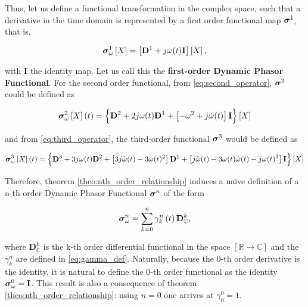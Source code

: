 	Thus, let us define a functional transformation in the complex space, such that a derivative in the time domain is represented by a first order functional map $\boldsymbol{\sigma}^{1}$, that is,

\begin{equation} \boldsymbol{\sigma}^{1}_\omega \left[X\right] = \left[\mathbf{D}^1 + j\omega(t)\mathbf{I}\right]\left[X\right] , \label{eq:steinmetz_1storder}\end{equation}

	\noindent with $\mathbf{I}$ the identity map. Let us call this the \textbf{first-order Dynamic Phasor Functional}. For the second order functional, from \eqref{eq:second_operator}, $\boldsymbol{\sigma}^{2}$ could be defined as

\begin{equation} \ndpo{2}_\omega \left[X\right](t) = \left\{\raisebox{4mm}{} \mathbf{D}^2 + 2j\omega(t)\mathbf{D}^1 + \left[-\omega^2 + j\dot{\omega}(t)\right]\mathbf{I}\right\}\left[X\right] \label{eq:steinmetz_2ndorder}\end{equation}

	\noindent and from \eqref{eq:third_operator}, the third-order functional $\boldsymbol{\sigma}^{3}$ would be defined as

\small
\begin{equation} \ndpo{3}_\omega \left[X\right](t) = \left\{\raisebox{4mm}{} \mathbf{D}^3 + 3j \omega(t) \mathbf{D}^2 + \left[ 3j \dot{\omega}(t) - 3 \omega(t)^2 \right] \mathbf{D}^1 + \left[ j \ddot{\omega}(t) - 3 \omega(t) \dot{\omega}(t) - j \omega(t)^3 \right]\mathbf{I}\right\}\left[X\right] \label{eq:steinmetz_3rdorder}\end{equation}
\normalsize

	Therefore, theorem \ref{theo:nth_order_relationship} induces a naïve definition of a n-th order Dynamic Phasor Functional $\boldsymbol{\sigma}^{n}$ of the form

\begin{equation} \boldsymbol{\sigma}^{n}_\omega = \sum_{k=0}^n \gamma_k^n \left(t\right)\mathbf{D}^k_\mathbb{C} \label{def:operated_dynamic_phasor}, \end{equation}

	\noindent where $\mathbf{D}_\mathbb{C}^k$ is the k-th order differential functional in the space $\left[\mathbb{R}\to\mathbb{C}\right]$ and the $\gamma_k^n$ are defined in \eqref{eq:gamma_def}. Naturally, because the 0-th order derivative is the identity, it is natural to define the 0-th order functional as the identity $\boldsymbol{\sigma}^0_\omega = \mathbf{I}$. This result is also a consequence of theorem \ref{theo:nth_order_relationship}: using $n=0$ one arrives at $\gamma_0^0 = 1$.

